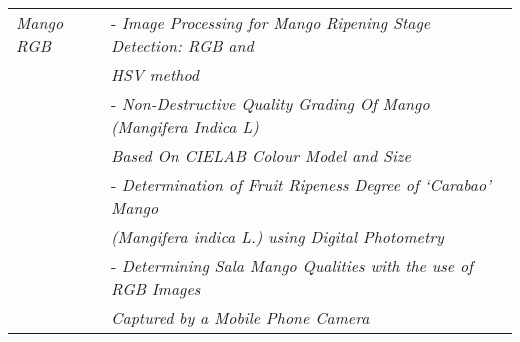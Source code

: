 \begin{center}
\begin{longtable}{ll}
\textit{Mango RGB}							& - \textit{Image Processing for Mango Ripening Stage Detection: RGB and} \\
											&	\textit{HSV method} \\ 
											& - \textit{Non-Destructive Quality Grading Of Mango (Mangifera Indica L)} \\
											&	\textit{Based On CIELAB Colour Model and Size}  \\
											& - \textit{Determination of Fruit Ripeness Degree of ‘Carabao’ Mango} \\
											&	\textit{(Mangifera indica L.) using Digital Photometry} 	\\
											& - \textit{Determining Sala Mango Qualities with the use of RGB Images} \\
											&	\textit{Captured by a Mobile Phone Camera} \\ \hline

\end{longtable}
\end{center}